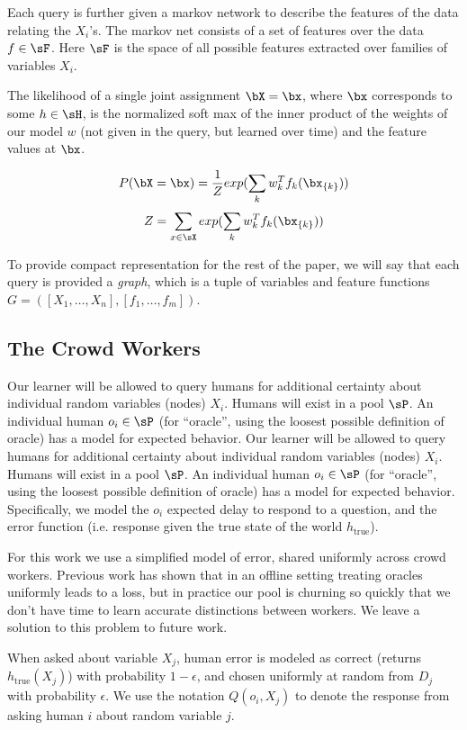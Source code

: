 Each query is further given a markov network to describe the features of the data relating the $X_i$'s.
 The markov net consists of a set of features over the data $f \in \sF$.
 Here $\sF$ is the space of all possible features extracted over families of variables $X_i$.

The likelihood of a single joint assignment $\bX = \bx$, where $\bx$ corresponds to some $h \in \sH$, is the normalized soft max of the inner product of the weights of our model $w$ (not given in the query, but learned over time) and the feature values at $\bx$.


\[P(\bX = \bx) = \frac{1}{Z}exp(\sum_k w_k^Tf_k(\bx_{\{k\}}))\]
\[Z = \sum_{x\in\sX} exp(\sum_k w_k^Tf_k(\bx_{\{k\}}))\]

To provide compact representation for the rest of the paper, we will say that each query is provided a \textit{graph}, which is a tuple of variables and feature functions $G = ([X_1, \ldots, X_n], [f_1, \ldots, f_m])$.


\subsection{The Crowd Workers}

Our learner will be allowed to query humans for additional certainty about individual random variables (nodes) $X_i$.
 Humans will exist in a pool $\sP$.
 An individual human $o_i \in \sP$ (for ``oracle'', using the loosest possible definition of oracle) has a model for expected behavior.
Our learner will be allowed to query humans for additional certainty about individual random variables (nodes) $X_i$.
 Humans will exist in a pool $\sP$.
 An individual human $o_i \in \sP$ (for ``oracle'', using the loosest possible definition of oracle) has a model for expected behavior. Specifically, we model the $o_i$ expected delay to respond to a question, and the error function (i.e. response given the true state of the world $h_{\text{true}}$).

For this work we use a simplified model of error, shared uniformly across crowd workers.
 Previous work \cite{yan2011active} \cite{donmez2008proactive} \cite{golovin2010near} has shown that in an offline setting treating oracles uniformly leads to a loss, but in practice our pool is churning so quickly that we don't have time to learn accurate distinctions between workers.
 We leave a solution to this problem to future work.

When asked about variable $X_j$, human error is modeled as correct (returns $h_{\text{true}}(X_j)$) with probability $1-\epsilon$, and chosen uniformly at random from $D_j$ with probability $\epsilon$.
 We use the notation $Q(o_i, X_j)$ to denote the response from asking human $i$ about random variable $j$.

